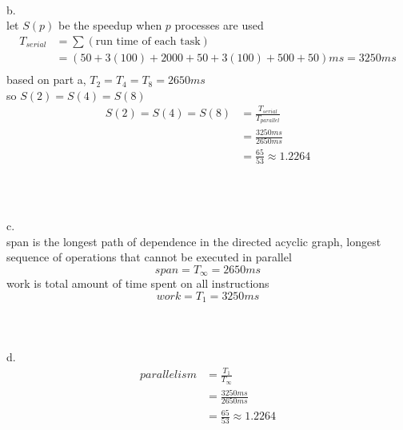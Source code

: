 \documentclass[12pt,border=4pt,multi]{article}%
\begin{document}
\\
\\
\\
b.\\
let $S(p)$ be the speedup when $p$ processes are used
\begin{align*}
T_{serial} &= \sum (\text{run time of each task})\\
&= (50 + 3(100) + 2000 + 50 + 3(100) + 500 + 50)ms = 3250ms\\
\end{align*}
based on part a, $T_2 = T_4 = T_8 = 2650ms$\\
so $S(2) = S(4) = S(8)$
{\large
\begin{align*}
S(2) = S(4) = S(8) &= \frac{T_{serial}}{T_{parallel}}\\
&= \frac{3250ms}{2650ms}\\
&= \frac{65}{53} \approx 1.2264\\
\end{align*}}
\\
\\
\\
c.\\
span is the longest path of dependence in the directed acyclic graph, longest sequence of operations that cannot be executed in parallel
\[span = T_{\infty} = 2650ms\]
work is total amount of time spent on all instructions
\[work = T_1 = 3250ms\]
\\
\\
\\
d.
\begin{align*}
parallelism &= \frac{T_1}{T_{\infty}}\\
&= \frac{3250ms}{2650ms}\\
&= \frac{65}{53} \approx 1.2264\\
\end{align*}
\end{document}

